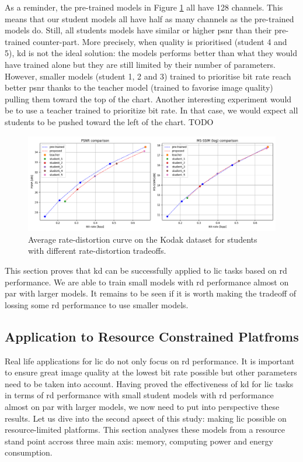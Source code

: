 As a reminder, the pre-trained models in Figure \ref{kd_lic_4} all have 128 channels. This means that our student models all have half as many channels as the pre-trained models do. Still, all students models have similar or higher \acrshort{psnr} than their pre-trained counter-part. More precisely, when quality is prioritised (student 4 and 5), \acrshort{kd} is not the ideal solution: the models performs better than what they would have trained alone but they are still limited by their number of parameters. However, smaller models (student 1, 2 and 3) trained to prioritise bit rate reach better \acrshort{psnr} thanks to the teacher model (trained to favorise image quality) pulling them toward the top of the chart. Another interesting experiment would be to use a teacher trained to prioritize bit rate. In that case, we would expect all students to be pushed toward the left of the chart. TODO

\begin{figure}
    \centering
    \includegraphics[width=15cm]{img/kd_lic_rd_lambda_1.png}
    \caption[Average rate-distortion curve on the Kodak dataset for students with different rate-distortion tradeoffs.]{Average rate-distortion curve on the Kodak dataset for students with different rate-distortion tradeoffs.}
    \label{kd_lic_4}
\end{figure}

This section proves that \acrshort{kd} can be successfully applied to \acrshort{lic} tasks based on \acrshort{rd} performance. We are able to train small models with \acrshort{rd} performance almost on par with larger models. It remains to be seen if it is worth making the tradeoff of lossing some \acrshort{rd} performance to use smaller models.

\subsection{Application to Resource Constrained Platfroms}
Real life applications for \acrshort{lic} do not only focus on \acrshort{rd} performance. It is important to ensure great image quality at the lowest bit rate possible but other parameters need to be taken into account. Having proved the effectiveness of \acrshort{kd} for \acrshort{lic} tasks in terms of \acrshort{rd} performance with small student models with \acrshort{rd} performance almost on par with larger models, we now need to put into perspective these results. Let us dive into the second apsect of this study: making \acrshort{lic} possible on resource-limited platforms. This section analyses these models from a resource stand point accross three main axis: memory, computing power and energy consumption.


